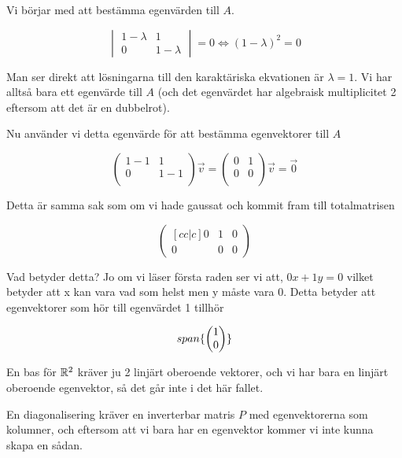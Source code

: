 \documentclass[../../main.tex]{subfiles}
\begin{document}
\begin{solution}{4}


Vi börjar med att bestämma egenvärden till $A$.

$$
\begin{vmatrix}
    1 - \lambda & 1\\
    0 & 1 - \lambda
\end{vmatrix} = 0 \iff
(1-\lambda)^2 = 0
$$

Man ser direkt att lösningarna till den karaktäriska ekvationen är $\lambda = 1$. Vi har alltså bara ett egenvärde till $A$ (och det egenvärdet har algebraisk multiplicitet 2 eftersom att det är en dubbelrot).

Nu använder vi detta egenvärde för att bestämma egenvektorer till $A$

$$
\begin{pmatrix}
    1 - 1 & 1\\
    0 & 1 - 1\\
\end{pmatrix}\Vec{v} = 
\begin{pmatrix}
    0 & 1\\
    0 & 0\\
\end{pmatrix}\Vec{v} = \Vec{0}
$$

Detta är samma sak som om vi hade gaussat och kommit fram till totalmatrisen

$$
\begin{pmatrix}[cc|c]
    0 & 1 & 0\\
    0 & 0 & 0
\end{pmatrix}
$$

Vad betyder detta? Jo om vi läser första raden ser vi att, $0x + 1y = 0$ vilket betyder att x kan vara vad som helst men y måste vara 0. Detta betyder att egenvektorer som hör till egenvärdet 1 tillhör

$$span\{\begin{pmatrix}1\\0\end{pmatrix}\}$$

En bas för $\mathbb{R}^{2}$ kräver ju 2 linjärt oberoende vektorer, och vi har bara en linjärt oberoende egenvektor, så det går inte i det här fallet.

En diagonalisering kräver en inverterbar matris $P$ med egenvektorerna som kolumner, och eftersom att vi bara har en egenvektor kommer vi inte kunna skapa en sådan.

\end{solution}
\end{document}
